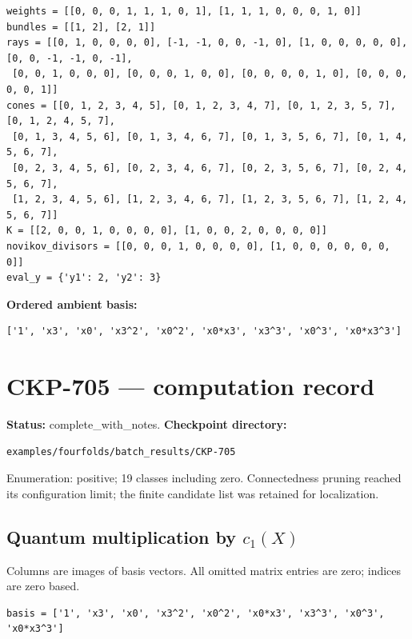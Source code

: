 \documentclass[10pt,a4paper]{article}
\begin{document}
\begin{lstlisting}
weights = [[0, 0, 0, 1, 1, 1, 0, 1], [1, 1, 1, 0, 0, 0, 1, 0]]
bundles = [[1, 2], [2, 1]]
rays = [[0, 1, 0, 0, 0, 0], [-1, -1, 0, 0, -1, 0], [1, 0, 0, 0, 0, 0], [0, 0, -1, -1, 0, -1],
 [0, 0, 1, 0, 0, 0], [0, 0, 0, 1, 0, 0], [0, 0, 0, 0, 1, 0], [0, 0, 0, 0, 0, 1]]
cones = [[0, 1, 2, 3, 4, 5], [0, 1, 2, 3, 4, 7], [0, 1, 2, 3, 5, 7], [0, 1, 2, 4, 5, 7],
 [0, 1, 3, 4, 5, 6], [0, 1, 3, 4, 6, 7], [0, 1, 3, 5, 6, 7], [0, 1, 4, 5, 6, 7],
 [0, 2, 3, 4, 5, 6], [0, 2, 3, 4, 6, 7], [0, 2, 3, 5, 6, 7], [0, 2, 4, 5, 6, 7],
 [1, 2, 3, 4, 5, 6], [1, 2, 3, 4, 6, 7], [1, 2, 3, 5, 6, 7], [1, 2, 4, 5, 6, 7]]
K = [[2, 0, 0, 1, 0, 0, 0, 0], [1, 0, 0, 2, 0, 0, 0, 0]]
novikov_divisors = [[0, 0, 0, 1, 0, 0, 0, 0], [1, 0, 0, 0, 0, 0, 0, 0]]
eval_y = {'y1': 2, 'y2': 3}
\end{lstlisting}

\textbf{Ordered ambient basis:}
\begin{lstlisting}
['1', 'x3', 'x0', 'x3^2', 'x0^2', 'x0*x3', 'x3^3', 'x0^3', 'x0*x3^3']
\end{lstlisting}

\clearpage\section*{CKP-705 --- computation record}
\textbf{Status:} complete\_with\_notes.
\textbf{Checkpoint directory:}
\begin{lstlisting}
examples/fourfolds/batch_results/CKP-705
\end{lstlisting}

Enumeration: positive; 19 classes including zero.
Connectedness pruning reached its configuration limit; the finite candidate list was retained for localization.
\subsection*{Quantum multiplication by $c_1(X)$}
Columns are images of basis vectors. All omitted matrix entries are zero; indices are zero based.

\begin{lstlisting}
basis = ['1', 'x3', 'x0', 'x3^2', 'x0^2', 'x0*x3', 'x3^3', 'x0^3', 'x0*x3^3']
\end{lstlisting}
\end{document}
